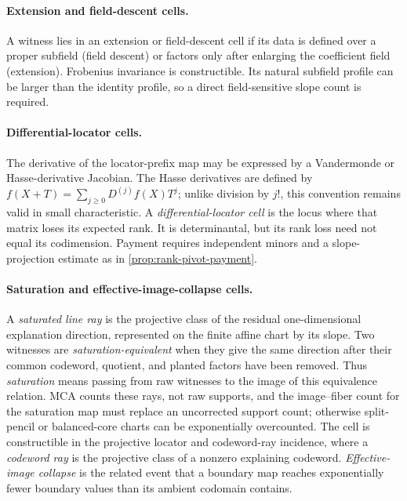 \documentclass[12pt,a4paper]{amsart}
\numberwithin{equation}{section}
\theoremstyle{remark}
\begin{document}
\paragraph{Extension and field-descent cells.}
A witness lies in an extension or field-descent cell if its data is defined over
a proper subfield (field descent) or factors only after enlarging the coefficient
field (extension).  Frobenius invariance is
constructible.  Its natural subfield profile can be larger than the
identity profile, so a direct field-sensitive slope count is required.

\paragraph{Differential-locator cells.}
The derivative of the locator-prefix map may be expressed by a Vandermonde
or Hasse-derivative Jacobian.  The Hasse derivatives are defined by
\(f(X+T)=\sum_{j\ge0}D^{(j)}f(X)T^j\); unlike division by \(j!\), this
convention remains valid in small characteristic.  A
\emph{differential-locator cell} is the
locus where that matrix loses its expected rank.  It is determinantal, but
its rank loss
need not equal its codimension.  Payment requires independent minors and a
slope-projection estimate as in \cref{prop:rank-pivot-payment}.

\paragraph{Saturation and effective-image-collapse cells.}
A \emph{saturated line ray} is the projective class of the residual
one-dimensional explanation direction, represented on the finite affine
chart by its slope.  Two witnesses are \emph{saturation-equivalent} when
they give the same direction after their common codeword, quotient, and
planted factors have been removed.  Thus \emph{saturation} means passing
from raw witnesses to the image of this equivalence relation.  MCA counts
these rays, not raw supports, and the image--fiber count for the saturation
map must replace an uncorrected support count; otherwise split-pencil or
balanced-core charts can be exponentially overcounted.  The cell is
constructible in the projective locator and codeword-ray incidence, where a
\emph{codeword ray} is the projective class of a nonzero explaining
codeword.
\emph{Effective-image collapse} is the related event that a boundary map
reaches exponentially fewer boundary values than its ambient codomain contains.
\end{document}
